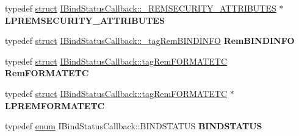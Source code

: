 \begin{DoxyCompactItemize}
\item 
\mbox{\label{interface_i_bind_status_callback_ab5380ff4fff14b374e436f40b2f382af}} 
typedef \hyperlink{interfacestruct}{struct} \hyperlink{struct_i_bind_status_callback_1_1___r_e_m_s_e_c_u_r_i_t_y___a_t_t_r_i_b_u_t_e_s}{I\+Bind\+Status\+Callback\+::\+\_\+\+R\+E\+M\+S\+E\+C\+U\+R\+I\+T\+Y\+\_\+\+A\+T\+T\+R\+I\+B\+U\+T\+ES} $\ast$ {\bfseries L\+P\+R\+E\+M\+S\+E\+C\+U\+R\+I\+T\+Y\+\_\+\+A\+T\+T\+R\+I\+B\+U\+T\+ES}
\item 
\mbox{\label{interface_i_bind_status_callback_adcddfe548809b648d6e4a0eb176d76d2}} 
typedef \hyperlink{interfacestruct}{struct} \hyperlink{struct_i_bind_status_callback_1_1__tag_rem_b_i_n_d_i_n_f_o}{I\+Bind\+Status\+Callback\+::\+\_\+tag\+Rem\+B\+I\+N\+D\+I\+N\+FO} {\bfseries Rem\+B\+I\+N\+D\+I\+N\+FO}
\item 
\mbox{\label{interface_i_bind_status_callback_a6dcbbef209333063df3bf2ad2160f6b0}} 
typedef \hyperlink{interfacestruct}{struct} \hyperlink{struct_i_bind_status_callback_1_1tag_rem_f_o_r_m_a_t_e_t_c}{I\+Bind\+Status\+Callback\+::tag\+Rem\+F\+O\+R\+M\+A\+T\+E\+TC} {\bfseries Rem\+F\+O\+R\+M\+A\+T\+E\+TC}
\item 
\mbox{\label{interface_i_bind_status_callback_a5e4187c384ac91583ae43d097477d075}} 
typedef \hyperlink{interfacestruct}{struct} \hyperlink{struct_i_bind_status_callback_1_1tag_rem_f_o_r_m_a_t_e_t_c}{I\+Bind\+Status\+Callback\+::tag\+Rem\+F\+O\+R\+M\+A\+T\+E\+TC} $\ast$ {\bfseries L\+P\+R\+E\+M\+F\+O\+R\+M\+A\+T\+E\+TC}
\item 
\mbox{\label{interface_i_bind_status_callback_a0afba9bb7017cc3321e8d03ece884a22}} 
typedef \hyperlink{interfaceenum}{enum} I\+Bind\+Status\+Callback\+::\+B\+I\+N\+D\+S\+T\+A\+T\+US {\bfseries B\+I\+N\+D\+S\+T\+A\+T\+US}
\end{DoxyCompactItemize}
